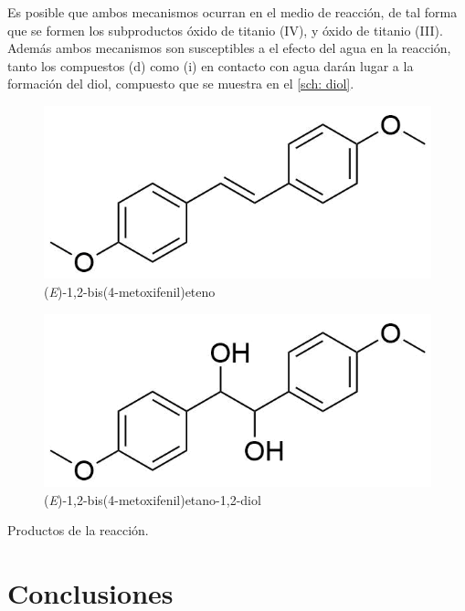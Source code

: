 \documentclass[fleqn,11pt]{SelfArx}
\begin{document}
Es posible que ambos mecanismos ocurran en el medio de reacci\'on, de tal forma que se formen los subproductos \'oxido de titanio (IV), y \'oxido de titanio (III). Adem\'as ambos mecanismos son susceptibles a el efecto del agua en la reacci\'on, tanto los compuestos (d) como (i) en contacto con agua dar\'an lugar a la formaci\'on del diol, compuesto que se muestra en el \autoref{sch: diol}.
\begin{scheme}[h]
	\centering
	\scriptsize
	\begin{subfigure}[t]{0.49\linewidth}
		\centering
		\includegraphics[width=0.9\linewidth]{structures/product.png}
		\caption{(\textit{E})-1,2-bis(4-metoxifenil)eteno}
		\label{sch: producto}
	\end{subfigure}
	\begin{subfigure}[t]{0.49\linewidth}
		\centering
		\includegraphics[width=0.9\linewidth]{structures/product2.png}
		\caption{(\textit{E})-1,2-bis(4-metoxifenil)etano-1,2-diol}
		\label{sch: diol}
	\end{subfigure}
	\caption{Productos de la reacci\'on.}
\end{scheme}

\section{Conclusiones}
\end{document}
